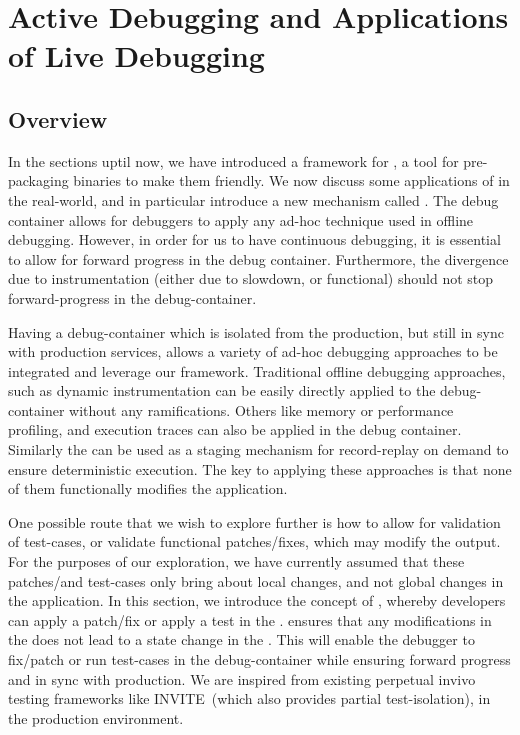 \chapter{Active Debugging and Applications of Live Debugging}
\label{ch:activedebugging}

\section{Overview}
\label{sec:guided_overview}

In the sections uptil now, we have introduced a framework for \livedebugging, a tool for pre-packaging binaries to make them \livedebugging friendly. 
We now discuss some applications of \livedebugging in the real-world, and in particular introduce a new mechanism called \activedebugging.
The debug container allows for debuggers to apply any ad-hoc technique used in offline debugging.
However, in order for us to have continuous debugging, it is essential to allow for forward progress in the debug container. 
Furthermore, the divergence due to instrumentation (either due to slowdown, or functional) should not stop forward-progress in the debug-container.

Having a debug-container which is isolated from the production, but still in sync with production services, allows a variety of ad-hoc debugging approaches to be integrated and leverage our framework.
Traditional offline debugging approaches, such as dynamic instrumentation can be easily directly applied to the debug-container without any ramifications. 
Others like memory or performance profiling, and execution traces can also be applied in the debug container.
Similarly the \debugcontainer can be used as a staging mechanism for record-replay on demand to ensure deterministic execution.
The key to applying these approaches is that none of them functionally modifies the application.

One possible route that we wish to explore further is how to allow for validation of test-cases, or validate functional patches/fixes, which may modify the output.
For the purposes of our exploration, we have currently assumed that these patches/and test-cases only bring about local changes, and not global changes in the application.
In this section, we introduce the concept of \activedebugging, whereby developers can apply a patch/fix or apply a test in the \debugcontainer.
\activedebugging ensures that any modifications in the \debugcontainer does not lead to a state change in the \productioncontainer.
This will enable the debugger to fix/patch or run test-cases in the debug-container while ensuring forward progress and in sync with production. 
We are inspired from existing perpetual invivo testing frameworks like INVITE~\cite{invivo}(which also provides partial test-isolation), in the production environment.

